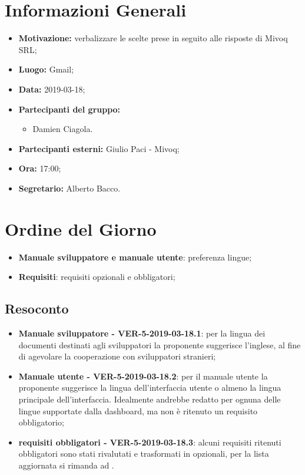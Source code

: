 \documentclass[a4paper, oneside, openany, dvipsnames, table]{article}
\begin{document}
\copertina{}


\newpage
\tableofcontents
\newpage
\section{Informazioni Generali}
\begin{itemize}
\item \textbf{Motivazione:} verbalizzare le scelte prese in seguito alle risposte di Mivoq SRL;
\item \textbf{Luogo:} Gmail;
\item \textbf{Data:} 2019-03-18;
\item \textbf{Partecipanti del gruppo:} \hfill
	\begin{itemize}
	\item Damien Ciagola.
	\end{itemize} 
\item \textbf{Partecipanti esterni:} Giulio Paci - Mivoq;
\item \textbf{Ora:} 17:00;
\item \textbf{Segretario:} Alberto Bacco.
\end{itemize}

\section{Ordine del Giorno}
\begin{itemize}
	\item \textbf{Manuale sviluppatore e manuale utente}: preferenza lingue;
	\item \textbf{Requisiti}: requisiti opzionali e obbligatori;
\end{itemize}

\subsection{Resoconto}
\begin{itemize}
\item \textbf{Manuale sviluppatore - VER-5-2019-03-18.1}: 
	per la lingua dei documenti destinati agli sviluppatori 
	la proponente suggerisce l'inglese, al fine di agevolare la cooperazione 
	con sviluppatori stranieri;
\item \textbf{Manuale utente - VER-5-2019-03-18.2}:
	per il manuale utente la proponente suggerisce la lingua dell'interfaccia 
	utente o almeno la lingua principale dell'interfaccia.
	Idealmente andrebbe redatto per ognuna delle lingue supportate 
	dalla dashboard, ma non è ritenuto un requisito obbligatorio;
\item \textbf{requisiti obbligatori - VER-5-2019-03-18.3}: 
	alcuni requisiti ritenuti obbligatori sono stati rivalutati e trasformati in opzionali, 
	per la lista aggiornata si 	rimanda ad \AdR .
\end{itemize}
\end{document}
